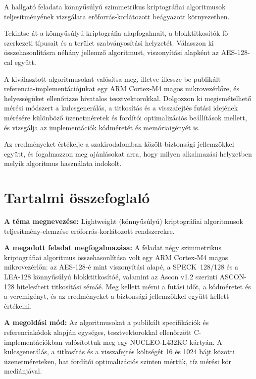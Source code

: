 \documentclass[a4paper,12pt]{report}
\theoremstyle{definition}
\theoremstyle{remark}
\begin{document}
A hallgató feladata könnyűsúlyú szimmetrikus kriptográfiai algoritmusok teljesítményének vizsgálata erőforrás-korlátozott beágyazott környezetben.

Tekintse át a könnyűsúlyú kriptográfia alapfogalmait, a blokktitkosítók fő szerkezeti típusait és a terület szabványosítási helyzetét. Válasszon ki összehasonlításra néhány jellemző algoritmust, viszonyítási alapként az AES-128-cal együtt.

A kiválasztott algoritmusokat valósítsa meg, illetve illessze be publikált referencia-implementációjukat egy ARM Cortex-M4 magos mikrovezérlőre, és helyességüket ellenőrizze hivatalos tesztvektorokkal. Dolgozzon ki megismételhető mérési módszert a kulcsgenerálás, a titkosítás és a visszafejtés futási idejének mérésére különböző üzenetméretek és fordítói optimalizációs beállítások mellett, és vizsgálja az implementációk kódméretét és memóriaigényét is.

Az eredményeket értékelje a szakirodalomban közölt biztonsági jellemzőkkel együtt, és fogalmazzon meg ajánlásokat arra, hogy milyen alkalmazási helyzetben melyik algoritmus használata indokolt.

\chapter*{Tartalmi összefoglaló}

\noindent\textbf{A téma megnevezése:} Lightweight (könnyűsúlyú) kriptográfiai algoritmusok teljesítmény-elemzése erőforrás-korlátozott rendszerekre.

\smallskip
\noindent\textbf{A megadott feladat megfogalmazása:} A feladat négy szimmetrikus kriptográfiai algoritmus összehasonlítása volt egy ARM Cortex-M4 magos mikrovezérlőn: az AES-128-é mint viszonyítási alapé, a SPECK~128/128 és a LEA-128 könnyűsúlyú blokktitkosítóé, valamint az Ascon v1.2 szerinti ASCON-128 hitelesített titkosítási sémáé. Meg kellett mérni a futási időt, a kódméretet és a veremigényt, és az eredményeket a biztonsági jellemzőkkel együtt kellett értékelni.

\smallskip
\noindent\textbf{A megoldási mód:} Az algoritmusokat a publikált specifikációk és referenciakódok alapján egységes, tesztvektorokkal ellenőrzött C-implementációkban valósítottuk meg egy NUCLEO-L432KC kártyán. A kulcsgenerálás, a titkosítás és a visszafejtés költségét 16 és 1024 bájt közötti üzenetméreteken, hat fordítói optimalizációs szinten mértük, tíz mérési kör mediánjával.
\end{document}
